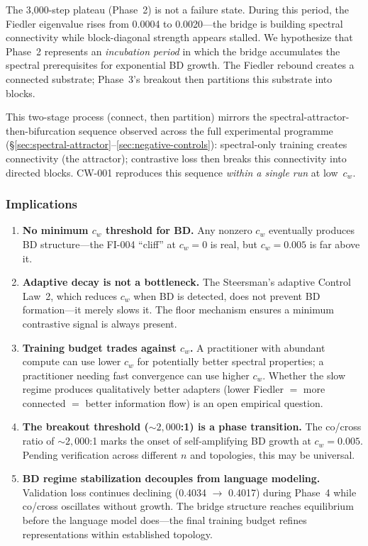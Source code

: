 The 3{,}000-step plateau (Phase~2) is not a failure state. During this
period, the Fiedler eigenvalue rises from 0.0004 to 0.0020---the bridge
is building spectral connectivity while block-diagonal strength appears
stalled. We hypothesize that Phase~2 represents an \emph{incubation
period} in which the bridge accumulates the spectral prerequisites for
exponential BD growth. The Fiedler rebound creates a connected substrate;
Phase~3's breakout then partitions this substrate into blocks.

This two-stage process (connect, then partition) mirrors the
spectral-attractor-then-bifurcation sequence observed across the full
experimental programme (\S\ref{sec:spectral-attractor}--\ref{sec:negative-controls}):
spectral-only training creates connectivity (the attractor); contrastive
loss then breaks this connectivity into directed blocks. CW-001
reproduces this sequence \emph{within a single run} at low~$c_w$.

\subsubsection{Implications}

\begin{enumerate}
\item \textbf{No minimum $c_w$ threshold for BD.} Any nonzero $c_w$
  eventually produces BD structure---the FI-004 ``cliff'' at $c_w = 0$
  is real, but $c_w = 0.005$ is far above it.
\item \textbf{Adaptive decay is not a bottleneck.} The Steersman's
  adaptive Control Law~2, which reduces $c_w$ when BD is detected, does
  not prevent BD formation---it merely slows it. The floor mechanism
  ensures a minimum contrastive signal is always present.
\item \textbf{Training budget trades against $c_w$.} A practitioner with
  abundant compute can use lower $c_w$ for potentially better spectral
  properties; a practitioner needing fast convergence can use higher
  $c_w$. Whether the slow regime produces qualitatively better adapters
  (lower Fiedler $=$ more connected $=$ better information flow) is an
  open empirical question.
\item \textbf{The breakout threshold (${\sim}2{,}000$:1) is a phase
  transition.} The co/cross ratio of ${\sim}2{,}000$:1 marks the onset
  of self-amplifying BD growth at $c_w = 0.005$. Pending verification
  across different $n$ and topologies, this may be universal.
\item \textbf{BD regime stabilization decouples from language modeling.}
  Validation loss continues declining (0.4034 $\to$ 0.4017) during
  Phase~4 while co/cross oscillates without growth. The bridge structure
  reaches equilibrium before the language model does---the final training
  budget refines representations within established topology.
\end{enumerate}
